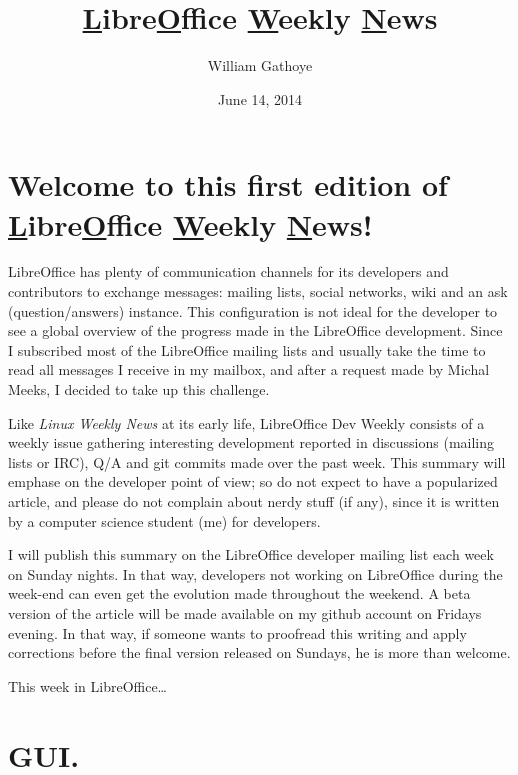\documentclass{article}
\begin{document}
\title{\underline{L}ibre\underline{O}ffice \underline{W}eekly \underline{N}ews}
\author{William Gathoye}
\date{June 14, 2014}
\maketitle



\section{\texorpdfstring{Welcome to this first edition of
\underline{L}ibre\underline{O}ffice \underline{W}eekly
\underline{N}ews!}{}}

LibreOffice has plenty of communication channels for its developers and
contributors to exchange messages: mailing lists, social networks, wiki and an
ask (question/answers) instance. This configuration is not ideal for the
developer to see a global overview of the progress made in the LibreOffice
development. Since I subscribed most of the LibreOffice mailing lists and
usually take the time to read all messages I receive in my mailbox, and after
a request made by Michal Meeks, I decided to take up this challenge.

Like \emph{Linux Weekly News} at its early life, LibreOffice Dev Weekly
consists of a weekly issue gathering interesting development reported in
discussions (mailing lists or IRC), Q/A and git commits made over the past
week. This summary will emphase on the developer point of view; so do not
expect to have a popularized article, and please do not complain about nerdy
stuff (if any), since it is written by a computer science student (me) for
developers. 

I will publish this summary on the LibreOffice developer mailing list each week
on Sunday nights. In that way, developers not working on LibreOffice during the
week-end can even get the evolution made throughout the weekend. A beta version
of the article will be made available on my github account\cite{wgetGithub} on
Fridays evening. In that way, if someone wants to proofread this writing and
apply corrections before the final version released on Sundays, he is more than
welcome.

This week in LibreOffice\ldots



\section{GUI.}
\end{document}
